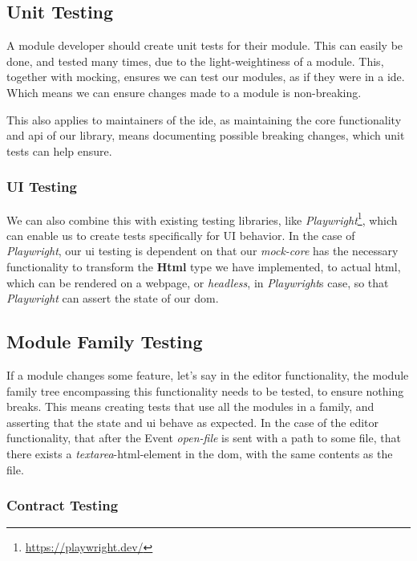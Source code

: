\subsection{Unit Testing}

A module developer should create unit tests for their module. This can easily be
done, and tested many times, due to the light-weightiness of a module. This,
together with mocking, ensures we can test our modules, as if they were in a
\gls{ide}. Which means we can ensure changes made to a module is non-breaking.

This also applies to maintainers of the \gls{ide}, as maintaining the core
functionality and \gls{api} of our library, means documenting possible breaking
changes, which unit tests can help ensure.

\subsubsection{UI Testing}

We can also combine this with existing testing libraries, like \textit{Playwright}\footnote{\url{https://playwright.dev/}},
which can enable us to create tests specifically for UI behavior. In the case of
\textit{Playwright}, our \gls{ui} testing is dependent on that our
\textit{mock-core} has the necessary functionality to transform the
\textbf{Html} type we have implemented, to actual \gls{html}, which can be
rendered on a webpage, or \textit{headless}, in \textit{Playwright}s case, so
that \textit{Playwright} can assert the state of our \gls{dom}.

\subsection{Module Family Testing}

If a module changes some feature, let's say in the editor functionality, the
module family tree encompassing this functionality needs to be tested, to ensure
nothing breaks. This means creating tests that use all the modules in a family,
and asserting that the state and \gls{ui} behave as expected. In the case of
the editor functionality, that after the Event \textit{open-file} is sent with
a path to some file, that there exists a \textit{textarea}-\gls{html}-element in
the \gls{dom}, with the same contents as the file.

\subsubsection{Contract Testing}

